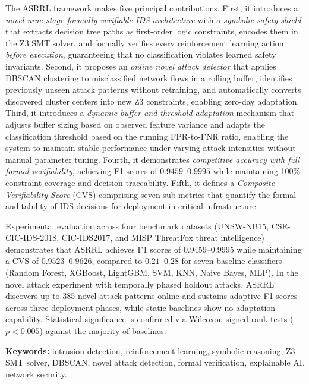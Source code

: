 \documentclass[12pt, letterpaper, oneside]{report}
\newcommand{\ASRRL}{\textsc{ASRRL}}
\begin{document}
The \ASRRL{} framework makes five principal contributions. First, it introduces a \emph{novel nine-stage formally verifiable IDS architecture} with a \emph{symbolic safety shield} that extracts decision tree paths as first-order logic constraints, encodes them in the Z3 SMT solver, and formally verifies every reinforcement learning action \emph{before execution}, guaranteeing that no classification violates learned safety invariants. Second, it proposes an \emph{online novel attack detector} that applies DBSCAN clustering to misclassified network flows in a rolling buffer, identifies previously unseen attack patterns without retraining, and automatically converts discovered cluster centers into new Z3 constraints, enabling zero-day adaptation. Third, it introduces a \emph{dynamic buffer and threshold adaptation} mechanism that adjusts buffer sizing based on observed feature variance and adapts the classification threshold based on the running FPR-to-FNR ratio, enabling the system to maintain stable performance under varying attack intensities without manual parameter tuning. Fourth, it demonstrates \emph{competitive accuracy with full formal verifiability}, achieving F1 scores of $0.9459$--$0.9995$ while maintaining 100\% constraint coverage and decision traceability. Fifth, it defines a \emph{Composite Verifiability Score} (CVS) comprising seven sub-metrics that quantify the formal auditability of IDS decisions for deployment in critical infrastructure.

Experimental evaluation across four benchmark datasets (UNSW-NB15, CSE-CIC-IDS-2018, CIC-IDS2017, and MISP ThreatFox threat intelligence) demonstrates that \ASRRL{} achieves F1 scores of $0.9459$--$0.9995$ while maintaining a CVS of $0.9523$--$0.9626$, compared to $0.21$--$0.28$ for seven baseline classifiers (Random Forest, XGBoost, LightGBM, SVM, KNN, Naive Bayes, MLP). In the novel attack experiment with temporally phased holdout attacks, \ASRRL{} discovers up to 385 novel attack patterns online and sustains adaptive F1 scores across three deployment phases, while static baselines show no adaptation capability. Statistical significance is confirmed via Wilcoxon signed-rank tests ($p < 0.005$) against the majority of baselines.

\textbf{Keywords:} intrusion detection, reinforcement learning, symbolic reasoning, Z3 SMT solver, DBSCAN, novel attack detection, formal verification, explainable AI, network security.

\end{document}
